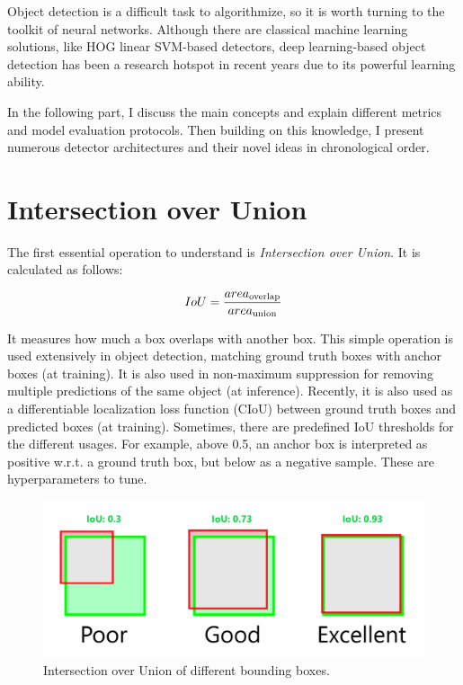 Object detection is a difficult task to algorithmize, so it is worth turning to the toolkit of neural networks. Although there are classical machine learning solutions, like HOG linear SVM-based detectors\cite{VehicleDetectionHOG-SVM}, deep learning-based object detection has been a research hotspot in recent years due to its powerful learning ability\cite{ObjDetDeepLearningReview}.

In the following part, I discuss the main concepts and explain different metrics and model evaluation protocols. Then building on this knowledge, I present numerous detector architectures and their novel ideas in chronological order.

\section{Intersection over Union}

The first essential operation to understand is \textit{Intersection over Union}. It is calculated as follows: 

\[IoU=\frac{area\textsubscript{overlap}}{area\textsubscript{union}}\]

It measures how much a box overlaps with another box. This simple operation is used extensively in object detection, matching ground truth boxes with anchor boxes (at training). It is also used in non-maximum suppression\cite{NMS} for removing multiple predictions of the same object (at inference). Recently, it is also used as a differentiable localization loss function (CIoU\cite{IoULosses}) between ground truth boxes and predicted boxes (at training). Sometimes, there are predefined IoU thresholds for the different usages. For example, above 0.5, an anchor box is interpreted as positive w.r.t. a ground truth box, but below as a negative sample. These are hyperparameters to tune.

\begin{figure}[htb]
 \centerline{\includegraphics[width=1.0\columnwidth]{.//Figure/Detector/IoU.png}}
 \caption{Intersection over Union of different bounding boxes.}
 \label{fig:IoU}
\end{figure}

